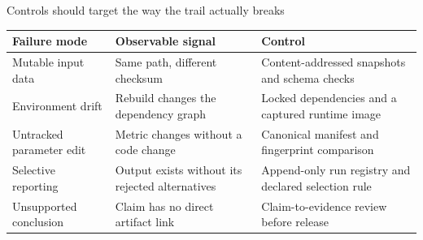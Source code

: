 \begin{frame}{Controls should target the way the trail actually breaks}
  \small
  \renewcommand{\arraystretch}{1.25}
  \begin{tabular}{>{\raggedright\arraybackslash}p{}
                  >{\raggedright\arraybackslash}p{}
                  >{\raggedright\arraybackslash}p{}}
    \toprule
    \textbf{Failure mode} & \textbf{Observable signal} & \textbf{Control} \\
    \midrule
    Mutable input data & Same path, different checksum &
      Content-addressed snapshots and schema checks \\
    Environment drift & Rebuild changes the dependency graph &
      Locked dependencies and a captured runtime image \\
    Untracked parameter edit & Metric changes without a code change &
      Canonical manifest and fingerprint comparison \\
    Selective reporting & Output exists without its rejected alternatives &
      Append-only run registry and declared selection rule \\
    Unsupported conclusion & Claim has no direct artifact link &
      Claim-to-evidence review before release \\
    \bottomrule
  \end{tabular}

\end{frame}
